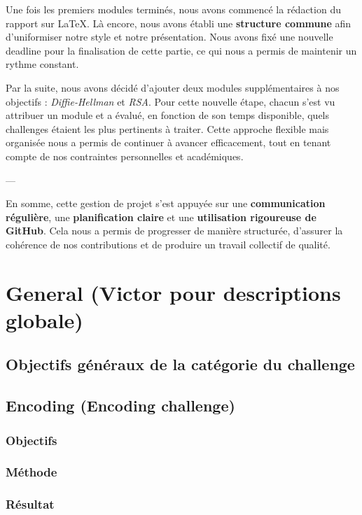 \documentclass[12pt, a4paper]{article}
\begin{document}
    Une fois les premiers modules terminés, nous avons commencé la rédaction du rapport sur \LaTeX{}. Là encore, nous avons établi une \textbf{structure commune} afin d’uniformiser notre style et notre présentation. Nous avons fixé une nouvelle deadline pour la finalisation de cette partie, ce qui nous a permis de maintenir un rythme constant.

    Par la suite, nous avons décidé d’ajouter deux modules supplémentaires à nos objectifs : \textit{Diffie-Hellman} et \textit{RSA}. Pour cette nouvelle étape, chacun s’est vu attribuer un module et a évalué, en fonction de son temps disponible, quels challenges étaient les plus pertinents à traiter.  
    Cette approche flexible mais organisée nous a permis de continuer à avancer efficacement, tout en tenant compte de nos contraintes personnelles et académiques.

    ---

    En somme, cette gestion de projet s’est appuyée sur une \textbf{communication régulière}, une \textbf{planification claire} et une \textbf{utilisation rigoureuse de GitHub}. Cela nous a permis de progresser de manière structurée, d’assurer la cohérence de nos contributions et de produire un travail collectif de qualité.

\section{General (Victor pour descriptions globale)}
    \subsection{Objectifs généraux de la catégorie du challenge}
    
    \subsection{Encoding (Encoding challenge)}
        \subsubsection{Objectifs}
        
        \subsubsection{Méthode}
        
        \subsubsection{Résultat}
        
\end{document}
